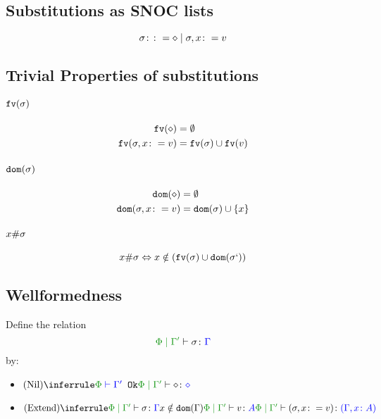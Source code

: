 \documentclass{report}
\begin{document}
\subsection{Substitutions as SNOC lists}

\begin{equation}
   \sigma \colon\colon= \diamond \mid \sigma, x \colon= v
\end{equation}

\subsection{Trivial Properties of substitutions}
\paragraph{$\texttt{fv}(\sigma)$}
\begin{align*}
    \texttt{fv}(\diamond) &= \emptyset\\
    \texttt{fv}(\sigma, x\colon= v) &= \texttt{fv}(\sigma)\cup\texttt{fv}(v)
\end{align*}
\paragraph{$\texttt{dom}(\sigma)$}
\begin{align*}
    \texttt{dom}(\diamond) & = \emptyset\\
    \texttt{dom}(\sigma, x\colon= v) & = \texttt{dom}(\sigma)\cup\left\{x\right\}
\end{align*}

\paragraph{$x \# \sigma$}
\begin{equation}
    x \# \sigma \Leftrightarrow x\notin(\texttt{fv}(\sigma)\cup\texttt{dom}(\sigma`))
\end{equation}

    \subsection{Wellformedness}
Define the relation $$\etyperelation{\P}{\G'}{\si}{\G}$$ by:

\begin{itemize}
    \item $\ntreeruleI{Nil}{\wellformedok{\P}{\G'}}{\etyperelation{\P}{\G'}{\nil}{\nil}}$
    \item $\ntreeruleIII{Extend}{
        \etyperelation{\P}{\G'}{\si}{\G}
        }{
        x\notin\dom{\G}
        }{
        \etyperelation{\P}{\G'}{v}{A}
    }{
        \etyperelation{\P}{\G'}{(\si, x \setto v)}{(\gax)}
    }$
\end{itemize}
   
\end{document}
